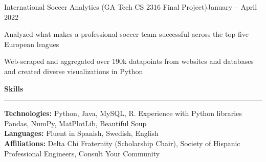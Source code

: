 \documentclass{article}
\newcommand{\horizontal}{\vspace{3pt}\hrule}
\newcommand{\sectitle}[1]{\vspace{3pt} \textbf{\large #1} \horizontal}
\newcommand{\skill}[2]{\textbf{#1:} #2}
\begin{document}
\begin{flushleft}
    \begin{subexperience}{International Soccer Analytics (GA Tech CS 2316 Final Project)}{January -- April 2022}
        \item Analyzed what makes a professional soccer team successful across the top five European leagues
        \item Web-scraped and aggregated over 190k datapoints from websites and databases and created diverse visualizations in Python
    \end{subexperience}

\sectitle{Skills}

    \vspace{3pt}
    \skill{Technologies}{Python, Java, MySQL, R. Experience with Python libraries Pandas, NumPy, MatPlotLib, Beautiful Soup} \\
    \skill{Languages}{Fluent in Spanish, Swedish, English} \\
    \skill{Affiliations}{Delta Chi Fraternity (Scholarship Chair), Society of Hispanic Professional Engineers, Consult Your Community}

\end{flushleft}
\end{document}
